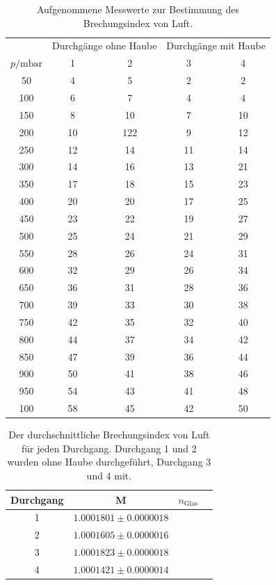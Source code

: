 \begin{table}[h]
  \centering
  \caption{Aufgenommene Messwerte zur Bestimmung des Brechungsindex von Luft.}
  \label{tab:Luft}
  \begin{tabular}{c c c c c}
    \toprule
    & \multicolumn{2}{c}{Durchgänge ohne Haube} & \multicolumn{2}{c}{Durchgänge mit Haube} \\
    \cmidrule(lr){2-3} \cmidrule(lr){4-5}
    $p / \si{\milli\bar}$ & 1 &2 &3 &4  \\
    \midrule
    50    &   4    &   5    &   2     &    2   \\
    100   &   6    &   7    &   4     &    4   \\
    150   &   8    &   10   &   7     &    10  \\
    200   &   10   &   122  &   9     &    12  \\
    250   &   12   &   14   &   11    &    14  \\
    300   &   14   &   16   &   13    &    21  \\
    350   &   17   &   18   &   15    &    23  \\
    400   &   20   &   20   &   17    &    25  \\
    450   &   23   &   22   &   19    &    27  \\
    500   &   25   &   24   &   21    &    29  \\
    550   &   28   &   26   &   24    &    31  \\
    600   &   32   &   29   &   26    &    34  \\
    650   &   36   &   31   &   28    &    36  \\
    700   &   39   &   33   &   30    &    38  \\
    750   &   42   &   35   &   32    &    40  \\
    800   &   44   &   37   &   34    &    42  \\
    850   &   47   &   39   &   36    &    44  \\
    900   &   50   &   41   &   38    &    46  \\
    950   &   54   &   43   &   41    &    48  \\
    100   &   58   &   45   &   42    &    50  \\ 
    \bottomrule
  \end{tabular}
\end{table}

\begin{table}[h]
  \centering
  \caption{Der durchschnittliche Brechungsindex von Luft für jeden Durchgang. Durchgang 1 und 2 wurden ohne Haube durchgeführt, Durchgang 3 und 4 mit.}
  \label{tab:n_luft_mean}
  \begin{tabular}{c c c c}
    \toprule
    Durchgang & M & $n_\text{Glas}$ \\
    \midrule
    1    &  $1.0001801 \pm 0.0000018$ \\   
    2    &  $1.0001605 \pm 0.0000016$ \\   
    3    &  $1.0001823 \pm 0.0000018$ \\   
    4    &  $1.0001421 \pm 0.0000014$ \\   
    \bottomrule
  \end{tabular}
\end{table}